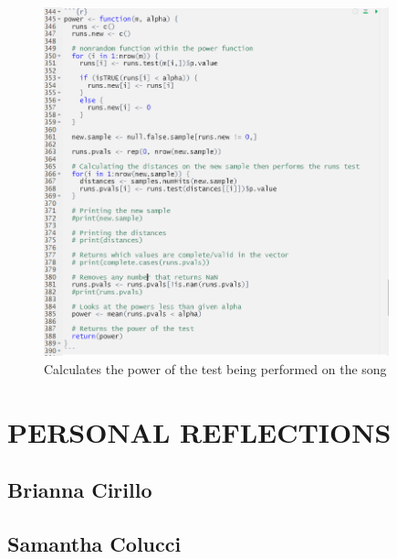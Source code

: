 \documentclass[12pt, letterpaper]{article}
\begin{document}
\begin{figure}
\centering
\includegraphics[width=10cm]{PowerCode.png}
\caption{Calculates the power of the test being performed on the song}
\label{fig: Power Code}
\end{figure}


\section{PERSONAL REFLECTIONS}
\subsection{Brianna Cirillo}
\subsection{Samantha Colucci}
\end{document}
